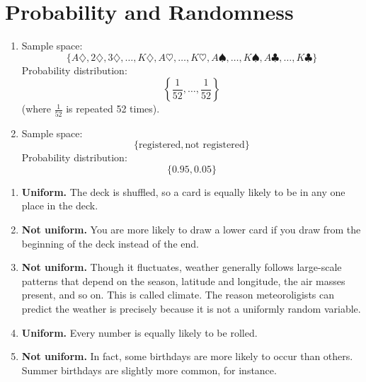 \section{Probability and Randomness}

\begin{answer}
    \renewcommand{\labelenumi}{(\alph{enumi})} 
    \begin{enumerate}
        \item Sample space: 
        \[
            \{A\diamondsuit, 2\diamondsuit, 3\diamondsuit, \ldots, K\diamondsuit, 
            A\heartsuit,\ldots,K\heartsuit,
            A\spadesuit,\ldots,K\spadesuit,
            A\clubsuit,\ldots,K\clubsuit\}  
        \]
        Probability distribution: 
        \[
            \left\{\frac{1}{52}, \ldots, \frac{1}{52}\right\} 
        \]
        (where $\frac{1}{52}$ is repeated 52 times).
        \item Sample space:
        \[
            \{\text{registered}, \text{not registered}\}
        \]
        Probability distribution:
        \[
            \{0.95, 0.05\}
        \]
    \end{enumerate}
\end{answer}

\begin{answer}
    \renewcommand{\labelenumi}{(\alph{enumi})} 
    \begin{enumerate}
        \item \textbf{Uniform.} The deck is shuffled, so a card is equally likely 
        to be in any one place in the deck.
        \item \textbf{Not uniform.} You are more likely to draw a lower card if 
        you draw from the beginning of the deck instead of the end.
        \item \textbf{Not uniform.} Though it fluctuates, weather generally follows 
        large-scale patterns that depend on the season, latitude and longitude,
        the air masses present, and so on. This is called climate. The reason 
        meteoroligists can predict the weather is precisely because it is 
        not a uniformly random variable.
        \item \textbf{Uniform.} Every number is equally likely to be rolled.
        \item \textbf{Not uniform.} In fact, some birthdays are more likely to occur 
        than others. Summer birthdays are slightly more common, for instance.\footnotemark
    \end{enumerate}
\end{answer}

